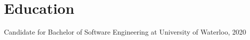 \documentclass[letterpaper]{kevin-resume}
\begin{document}
\begin{minipage}[t]{0.8\textwidth}

\section{Education}

Candidate for Bachelor of Software Engineering at University of Waterloo, 2020

\sectionspace %








\end{minipage} %
\end{document}
